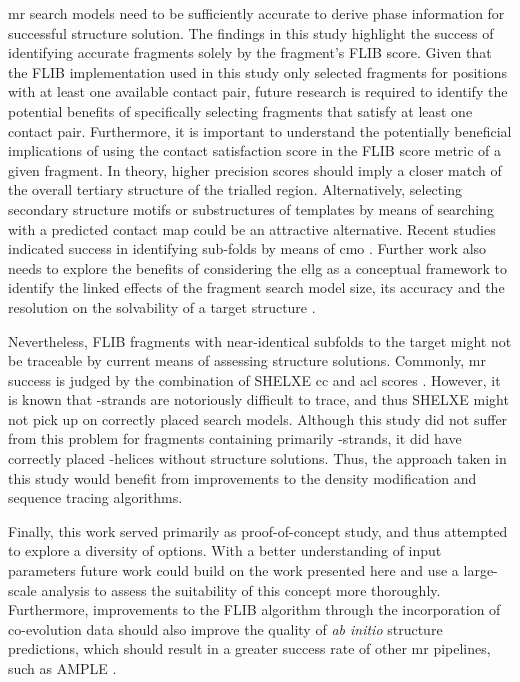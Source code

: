 \Gls{mr} search models need to be sufficiently accurate to derive phase information for successful structure solution. The findings in this study highlight the success of identifying accurate fragments solely by the fragment's FLIB score. Given that the FLIB implementation used in this study only selected fragments for positions with at least one available contact pair, future research is required to identify the potential benefits of specifically selecting fragments that satisfy at least one contact pair. Furthermore, it is important to understand the potentially beneficial implications of using the contact satisfaction score in the FLIB score metric of a given fragment. In theory, higher precision scores should imply a closer match of the overall tertiary structure of the trialled region. Alternatively, selecting secondary structure motifs or substructures of templates by means of searching with a predicted contact map could be an attractive alternative. Recent studies indicated success in identifying sub-folds by means of \gls{cmo} \cite{Buchan2017-ox,Ovchinnikov2017-nd}. Further work also needs to explore the benefits of considering the \gls{ellg} as a conceptual framework to identify the linked effects of the fragment search model size, its accuracy and the resolution on the solvability of a target structure \textcite{McCoy2017-cz}.

Nevertheless, FLIB fragments with near-identical subfolds to the target might not be traceable by current means of assessing structure solutions. Commonly, \gls{mr} success is judged by the combination of SHELXE \gls{cc} and \gls{acl} scores \cite{Thorn2013-le}. However, it is known that \textbeta-strands are notoriously difficult to trace, and thus SHELXE might not pick up on correctly placed search models. Although this study did not suffer from this problem for fragments containing primarily \textbeta-strands, it did have correctly placed \textalpha-helices without structure solutions. Thus, the approach taken in this study would benefit from improvements to the density modification and sequence tracing algorithms.

Finally, this work served primarily as proof-of-concept study, and thus attempted to explore a diversity of options. With a better understanding of input parameters future work could build on the work presented here and use a large-scale analysis to assess the suitability of this concept more thoroughly. Furthermore, improvements to the FLIB algorithm through the incorporation of co-evolution data should also improve the quality of \textit{ab initio} structure predictions, which should result in a greater success rate of other \gls{mr} pipelines, such as AMPLE \cite{Bibby2012-lm}.
